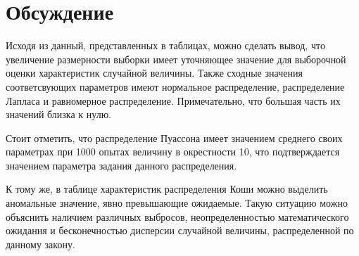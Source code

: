 \documentclass[12pt,a4paper]{article}
\begin{document}
\section{Обсуждение}
Исходя из данный, представленных в таблицах, можно сделать вывод, что увеличение размерности выборки имеет уточняющее значение для выборочной оценки характеристик случайной величины. Также сходные значения соответсвующих параметров имеют нормальное распределение, распределение Лапласа и равномерное распределение. Примечательно, что большая часть их значений близка к нулю.

Стоит отметить, что распределение Пуассона имеет значением среднего своих параметрах при 1000 опытах величину в окрестности 10, что подтверждается значением параметра задания данного распределения.

К тому же, в таблице характеристик распределения Коши можно выделить аномальные значение, явно превышающие ожидаемые. Такую ситуацию можно объяснить наличием различных выбросов, неопределенностью математического ожидания и бесконечностью дисперсии случайной величины, распределенной по данному закону.
\end{document}
